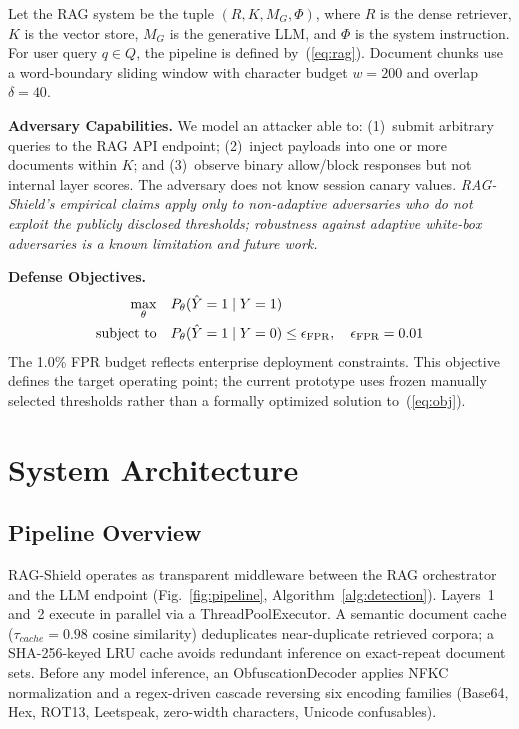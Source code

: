 ﻿\documentclass[conference]{IEEEtran}
\begin{document}
Let the RAG system be the tuple $(R, K, M_G, \Phi)$, where $R$ is the dense
retriever, $K$ is the vector store, $M_G$ is the generative LLM, and $\Phi$
is the system instruction.
For user query $q \in Q$, the pipeline is defined by~(\ref{eq:rag}).
Document chunks use a word-boundary sliding window with character budget
$w = 200$ and overlap $\delta = 40$.

\textbf{Adversary Capabilities.}
We model an attacker able to: (1)~submit arbitrary queries to the RAG API
endpoint; (2)~inject payloads into one or more documents within $K$; and
(3)~observe binary allow/block responses but not internal layer scores.
The adversary does not know session canary values.
\emph{RAG-Shield's empirical claims apply only to non-adaptive adversaries
who do not exploit the publicly disclosed thresholds; robustness against
adaptive white-box adversaries is a known limitation and future work.}

\textbf{Defense Objectives.}
\begin{align}
\max_\theta\quad &P_\theta(\hat{Y}=1 \mid Y=1) \notag\\
\text{subject to}\quad
  &P_\theta(\hat{Y}=1 \mid Y=0) \leq \epsilon_{\mathrm{FPR}},
  \quad \epsilon_{\mathrm{FPR}} = 0.01 \label{eq:obj}
\end{align}
The 1.0\% FPR budget reflects enterprise deployment constraints. This
objective defines the target operating point; the current prototype uses
frozen manually selected thresholds rather than a formally optimized solution
to~(\ref{eq:obj}).

\section{System Architecture}

\subsection{Pipeline Overview}

RAG-Shield operates as transparent middleware between the RAG orchestrator
and the LLM endpoint (Fig.~\ref{fig:pipeline},
Algorithm~\ref{alg:detection}).
Layers~1 and~2 execute in parallel via a ThreadPoolExecutor.
A semantic document cache ($\tau_{cache} = 0.98$ cosine similarity)
deduplicates near-duplicate retrieved corpora; a SHA-256-keyed LRU cache
avoids redundant inference on exact-repeat document sets.
Before any model inference, an ObfuscationDecoder applies NFKC normalization
and a regex-driven cascade reversing six encoding families (Base64, Hex,
ROT13, Leetspeak, zero-width characters, Unicode confusables).
\end{document}
